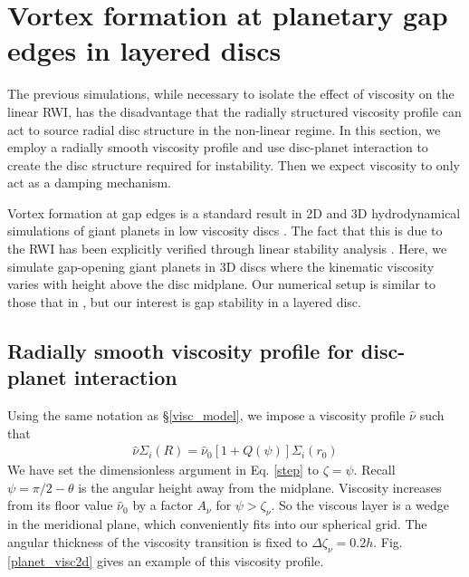 \section{Vortex formation at planetary gap edges in layered
  discs}\label{disc-planet} 
The previous simulations, while necessary to isolate the effect of 
viscosity on the linear RWI, has the disadvantage that the radially
structured viscosity profile can act to source radial disc structure
in the non-linear regime. In this section, we employ a radially smooth
viscosity profile and use 
disc-planet interaction to
create the disc structure required for instability. Then we expect viscosity to only
act as a damping mechanism. 

Vortex formation at gap edges is a standard result in 
2D and 3D hydrodynamical simulations of giant planets in low viscosity discs 
\citep{valborro07,lin10,lin11a,lin12,zhu13}. The fact that this is due to
the RWI has been explicitly verified through linear stability
analysis %
\citep{valborro07,lin10}. Here, we simulate gap-opening giant planets
in 3D discs where the kinematic viscosity varies with height above the
disc midplane. Our numerical setup is similar to
those that in \cite{pierens10}, but our interest is gap
stability in a layered disc. 
 
\subsection{Radially smooth viscosity profile for disc-planet
  interaction}\label{planet_visc_mode} 
Using the same notation as \S\ref{visc_model}, we impose a viscosity
profile $\hat{\nu}$ such that 
\begin{align}\label{planet_visc_profile}
  \hat{\nu}\Sigma_i(R)=
  \hat{\nu}_0\left[1+Q(\psi)\right]\Sigma_i(r_0)   
\end{align}
We have set the dimensionless argument in Eq. \ref{step} to
$\zeta=\psi$. Recall $\psi=\pi/2-\theta$ is the angular height away from the midplane. 
Viscosity increases from its floor value $\hat{\nu}_0$ by a factor
$A_\nu$ for $\psi > \zeta_\nu$. So the viscous layer is 
a wedge in the meridional plane, which conveniently fits into our
spherical grid.  
The angular thickness of the viscosity
transition is fixed to $\Delta\zeta_\nu =
0.2h$. Fig. \ref{planet_visc2d} gives an example of this  
viscosity profile. 

